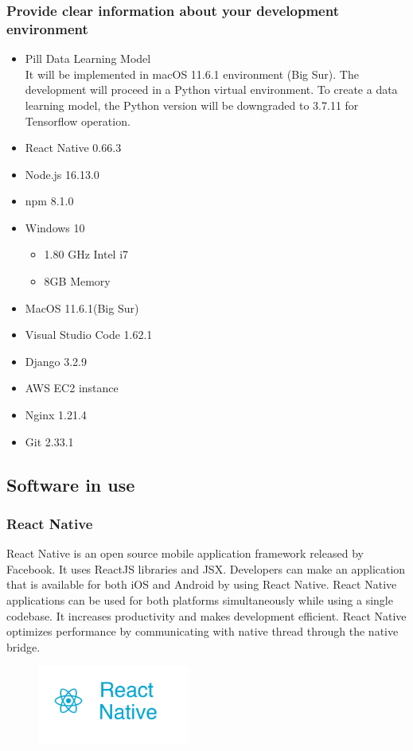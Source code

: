 \documentclass[conference]{IEEEtran}
\begin{document}
\subsubsection{Provide clear information about your development environment}
\begin{itemize}
  \item Pill Data Learning Model \\
It will be implemented in macOS 11.6.1 environment (Big Sur). The development will proceed in a Python virtual environment. To create a data learning model, the Python version will be downgraded to 3.7.11 for Tensorflow operation. 
  \item React Native 0.66.3
  \item Node.js 16.13.0
  \item npm 8.1.0
  \item Windows 10
  \begin{itemize}
         \item 1.80 GHz Intel i7
         \item 8GB Memory
       \end{itemize}
  \item MacOS 11.6.1(Big Sur)
  \item Visual Studio Code 1.62.1
  \item Django 3.2.9
  \item AWS EC2 instance
  \item Nginx 1.21.4
  \item Git 2.33.1
\end{itemize}

\subsection{Software in use}\label{AA}
\subsubsection{React Native}
React Native is an open source mobile application framework released by Facebook. It uses ReactJS libraries and JSX. Developers can make an application that is available for both  iOS and Android by using React Native. React Native applications can be used for both platforms simultaneously while using a single codebase. It increases productivity and makes development efficient. React Native optimizes performance by communicating with native thread through the native bridge. \\

\begin{figure}[h!]
\centering
\includegraphics[width=5cm]{imagefolder/react_native.png}
\caption{}
\label{fig:map}
\end{figure}
\end{document}
